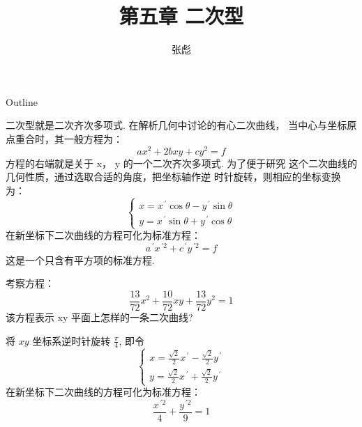 \documentclass[13pt]{beamer}
\begin{document}
\title[]{第五章 \quad 二次型}
\author[]{{\large 张彪}\\  }

\date{}


\AtBeginSection[]
{
\setcounter{exa}{0}
\setcounter{equation}{0}
}


\begin{frame}
\maketitle
\end{frame}

\begin{frame}{Outline}
	\tableofcontents
\end{frame}


\begin{frame}
二次型就是二次齐次多项式. 在解析几何中讨论的有心二次曲线，
当中心与坐标原点重合时，其一般方程为：
\[
a x^{2}+2 b x y+c y^{2}=f
\]
方程的右端就是关于 x， y 的一个二次齐次多项式. 为了便于研究
这个二次曲线的几何性质，通过选取合适的角度，把坐标轴作逆
时针旋转，则相应的坐标变换为：
\[
\left\{\begin{array}{l}
x=x^{\, \prime} \cos \theta-y^{\, \prime} \sin \theta \\
y=x^{\, \prime} \sin \theta+y^{\, \prime} \cos \theta
\end{array}\right.
\]
在新坐标下二次曲线的方程可化为标准方程：
\[
a^{\, \prime} x^{\, \prime 2}+c^{\, \prime} y^{\, \prime 2}=f
\]
这是一个只含有平方项的标准方程. 
\end{frame}

\begin{frame}
考察方程：
\[
\frac{13}{72} x^{2}+\frac{10}{72} x y+\frac{13}{72} y^{2}=1
\]
该方程表示 xy 平面上怎样的一条二次曲线?

将 $x y$ 坐标系逆时针旋转 $\frac{\pi}{4}$, 即令
\[
\left\{\begin{array}{l}
x=\frac{\sqrt{2}}{2} x^{\, \prime}-\frac{\sqrt{2}}{2} y^{\, \prime} \\
y=\frac{\sqrt{2}}{2} x^{\, \prime}+\frac{\sqrt{2}}{2} y^{\, \prime}
\end{array}\right.
\]
在新坐标下二次曲线的方程可化为标准方程：
\[
\frac{x^{\, \prime 2}}{4}+\frac{y^{\, \prime 2}}{9}=1
\]
\end{frame}
\end{document}

